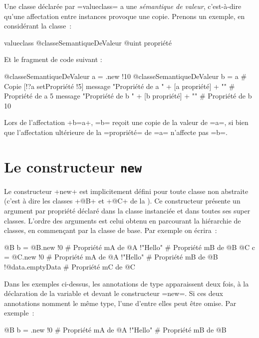 Une classe déclarée par \ggs=valueclass= a une \emph{sémantique de valeur}, c'est-à-dire qu'une affectation entre instances provoque une copie. Prenons un exemple, en considérant la classe~:

\begin{galgas}
valueclass @classeSemantiqueDeValeur {
  @uint propriété
}
\end{galgas}

Et le fragment de code suivant :

\begin{galgas}
@classeSemantiqueDeValeur a = .new {!10}
@classeSemantiqueDeValeur b = a # Copie
[!?a setPropriété !5]
message "Propriété de a " + [a propriété] + "\n" # Propriété de a 5
message "Propriété de b " + [b propriété] + "\n" # Propriété de b 10
\end{galgas}

Lors de l'affectation \ggs+b=a+, \ggs=b= reçoit une copie de la valeur de \ggs=a=, si bien que l'affectation ultérieure de la \ggs=propriété= de \ggs=a= n'affecte pas \ggs=b=.








\section{Le constructeur \texttt{new}}

Le constructeur \ggs+new+ est implicitement défini pour toute classe non abstraite (c'est à dire les classes \ggs+@B+ et \ggs+@C+ de la ). Ce constructeur présente un argument par propriété déclaré dans la classe instanciée et dans toutes ses super classes. L'ordre des arguments est celui obtenu en parcourant la hiérarchie de classes, en commençant par la classe de base. Par exemple on écrira~:

\begin{galgas}
@B b = @B.new {
  !0 # Propriété mA de @A
  !"Hello" # Propriété mB de @B
}
@C c = @C.new {
  !0 # Propriété mA de @A
  !"Hello" # Propriété mB de @B
  !@data.emptyData # Propriété mC de @C
}
\end{galgas}

Dans les exemples ci-dessus, les annotations de type apparaissent deux fois, à la déclaration de la variable et devant le constructeur \ggs=new=. Si ces deux annotations nomment le même type, l'une d'entre elles peut être omise. Par exemple~:

\begin{galgas}
@B b = .new {
  !0 # Propriété mA de @A
  !"Hello" # Propriété mB de @B
}
\end{galgas}

